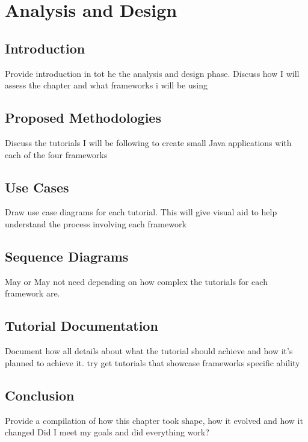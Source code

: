 \chapter*{Analysis and Design}
\section{Introduction}
Provide introduction in tot he the analysis and design phase.
Discuss how I will assess the chapter and what frameworks i will be using
\section{Proposed Methodologies}
Discuss the tutorials I will be following to create small Java applications
with each of the four frameworks
\section{Use Cases}
Draw use case diagrams for each tutorial. This will give visual aid to help
understand the process involving each framework
\section{Sequence Diagrams}
May or May not need depending on how complex the tutorials for each 
framework are.
\section{Tutorial Documentation}
Document how all details about what the tutorial should achieve and how
it's planned to achieve it. try get tutorials that showcase frameworks specific ability
\section{Conclusion}
Provide a compilation of how this chapter took shape, how it evolved and how it changed
Did I meet my goals and did everything work?
